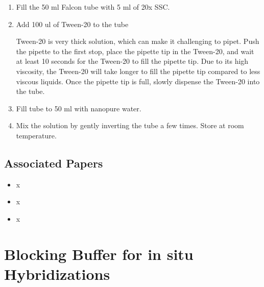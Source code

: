 \documentclass[
  letterpaper,
  DIV=11,
  numbers=noendperiod]{scrreprt}
\providecommand{\tightlist}{%
  \setlength{\itemsep}{0pt}\setlength{\parskip}{0pt}}\usepackage{longtable,booktabs,array}
\begin{document}
\begin{enumerate}
\def\labelenumi{\arabic{enumi}.}
\item
  Fill the 50 ml Falcon tube with 5 ml of 20x SSC.
\item
  Add 100 ul of Tween-20 to the tube

  \begin{tcolorbox}[enhanced jigsaw, toprule=.15mm, breakable, coltitle=black, leftrule=.75mm, title=\textcolor{quarto-callout-important-color}{\faExclamation}\hspace{0.5em}{NOTE}, bottomrule=.15mm, toptitle=1mm, bottomtitle=1mm, colframe=quarto-callout-important-color-frame, opacityback=0, colback=white, opacitybacktitle=0.6, colbacktitle=quarto-callout-important-color!10!white, rightrule=.15mm, titlerule=0mm, arc=.35mm, left=2mm]

  Tween-20 is very thick solution, which can make it challenging to
  pipet. Push the pipette to the first stop, place the pipette tip in
  the Tween-20, and wait at least 10 seconds for the Tween-20 to fill
  the pipette tip. Due to its high viscosity, the Tween-20 will take
  longer to fill the pipette tip compared to less viscous liquids. Once
  the pipette tip is full, slowly dispense the Tween-20 into the tube.

  \end{tcolorbox}
\item
  Fill tube to 50 ml with nanopure water.
\item
  Mix the solution by gently inverting the tube a few times. Store at
  room temperature.
\end{enumerate}

\hypertarget{associated-papers-67}{%
\section{Associated Papers}\label{associated-papers-67}}

\begin{itemize}
\tightlist
\item
  x
\item
  x
\item
  x
\end{itemize}

\hypertarget{sec-recipe-blocking_buffer}{%
\chapter{Blocking Buffer for in situ
Hybridizations}\label{sec-recipe-blocking_buffer}}
\end{document}
